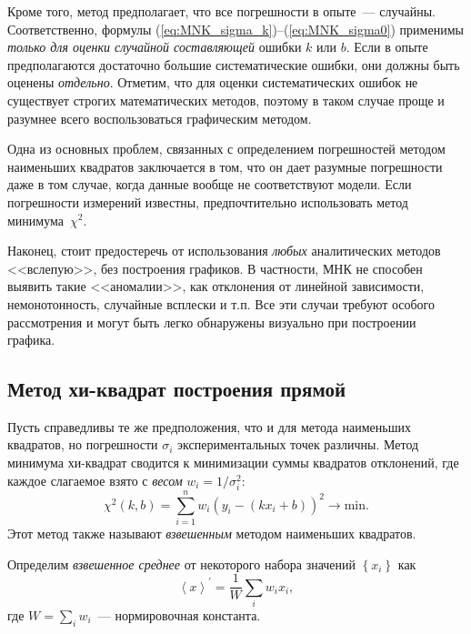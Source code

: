 Кроме того, метод предполагает, что все погрешности в опыте~---
случайны. Соответственно, формулы (\ref{eq:MNK_sigma_k})--(\ref{eq:MNK_sigma0})
применимы \emph{только для оценки случайной составляющей} ошибки $k$
или $b$. Если в опыте предполагаются достаточно большие систематические
ошибки, они должны быть оценены \emph{отдельно}. Отметим, что для
оценки систематических ошибок не существует строгих математических
методов, поэтому в таком случае проще и разумнее всего воспользоваться
графическим методом.

Одна из основных проблем, связанных с определением погрешностей методом
наименьших квадратов заключается в том, что он дает разумные погрешности даже в
том случае, когда данные вообще не соответствуют модели.
Если погрешности измерений известны, предпочтительно использовать
метод минимума~$\chi^2$.

Наконец, стоит предостеречь от использования \emph{любых} аналитических
методов <<вслепую>>, без построения графиков. В частности, МНК не способен
выявить такие <<аномалии>>, как отклонения от линейной зависимости,
немонотонность, случайные всплески и т.п. Все эти случаи требуют особого
рассмотрения и могут быть легко обнаружены визуально при построении графика.




\subsection{Метод хи-квадрат построения прямой}
\label{sec:linchi2}
Пусть справедливы те же предположения, что и для метода наименьших квадратов,
но погрешности $\sigma_{i}$ экспериментальных точек различны. Метод
минимума хи-квадрат сводится к минимизации суммы квадратов отклонений,
где каждое слагаемое взято с \emph{весом} $w_i = 1/\sigma_i^2$:
 \[
 \chi^2(k,b)=\sum\limits _{i=1}^{n}w_{i} \left(y_i-(kx_i+b)\right)^{2}\to\mathrm{min}.
\]
Этот метод также называют \emph{взвешенным} методом наименьших квадратов.

Определим \emph{взвешенное среднее} от
некоторого набора значений $\left\{x_{i}\right\}$ как
\[
\left\langle x\right\rangle ^{\prime}=\frac{1}{W}\sum_{i}w_{i}x_{i},
\]
где $W=\sum\limits_{i}w_{i}$~--- нормировочная константа.

